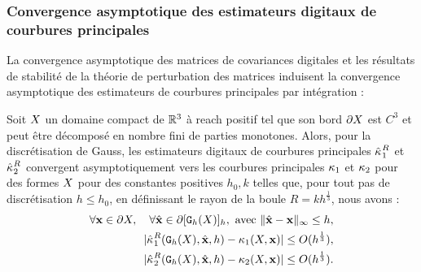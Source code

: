 \subsubsection{Convergence asymptotique des estimateurs digitaux de courbures principales}
%
La convergence asymptotique des matrices de covariances digitales et les
résultats de stabilité de la théorie de perturbation des matrices induisent la
convergence asymptotique des estimateurs de courbures principales par
intégration :
%
\begin{theorem}
\label{thm:multigrid-convergence-curv-k1k1}
%
  Soit $X$ un domaine compact de $\mathbb{R}^3$ à reach positif tel que son bord
  $\partial X$ est $C^3$ et peut être décomposé en nombre fini de parties monotones.
  Alors, pour la discrétisation de Gauss, les estimateurs digitaux de courbures
  principales $\hat{\kappa_{}}_{1}^{R}$ et $\hat{\kappa_{}}_{2}^{R}$ convergent
  asymptotiquement vers les courbures principales $\kappa_{1}$ et
  $\kappa_{2}$ pour des formes $X$ pour des constantes positives $h_0,
  k$ telles que, pour tout pas de discrétisation $h \le h_0$, en définissant le
  rayon de la boule $R = kh^{\frac{1}{3}}$, nous avons :
  \begin{align}
     \forall \mathbf{x} \in \partial X, \quad \forall \hat{\mathbf{x}} \in \partial \lbrack \mathtt{G}_{h}(X) \rbrack_{h}, \text{~avec~} \| \hat{\mathbf{x}} -\mathbf{x}\|_\infty \le h,\nonumber\\
     | \hat{\kappa_{}}_{1}^{R}(\mathtt{G}_{h}(X),\hat{\mathbf{x}},h) - \kappa_{1}(X,\mathbf{x}) | \le O(h^{\frac{1}{3}}) ,\\
     | \hat{\kappa_{}}_{2}^{R}(\mathtt{G}_{h}(X),\hat{\mathbf{x}},h) - \kappa_{2}(X,\mathbf{x}) | \le O(h^{\frac{1}{3}}) .
  \end{align}
\end{theorem}
